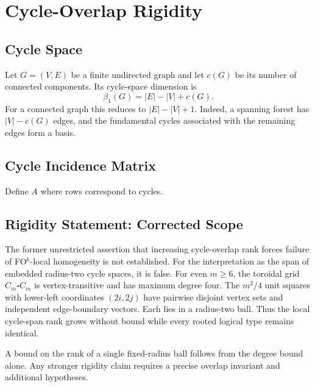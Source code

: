 \chapter{Cycle-Overlap Rigidity}

\section{Cycle Space}

Let \(G=(V,E)\) be a finite undirected graph and let \(c(G)\)
be its number of connected components. Its cycle-space dimension is
\[
\beta_1(G)=|E|-|V|+c(G).
\]
For a connected graph this reduces to \( |E|-|V|+1 \).
Indeed, a spanning forest has \( |V|-c(G) \) edges, and the
fundamental cycles associated with the remaining edges form a basis.

\section{Cycle Incidence Matrix}

Define \(A\) where rows correspond to cycles.

\section{Rigidity Statement: Corrected Scope}

The former unrestricted assertion that increasing cycle-overlap rank
forces failure of FO$^k$-local homogeneity is not established.
For the interpretation as the span of embedded radius-two cycle spaces,
it is false. For even \(m\ge6\), the toroidal grid
\(C_m\square C_m\) is vertex-transitive and has maximum degree four.
The \(m^2/4\) unit squares with lower-left coordinates \((2i,2j)\)
have pairwise disjoint vertex sets and independent edge-boundary vectors.
Each lies in a radius-two ball. Thus the local cycle-span rank grows
without bound while every rooted logical type remains identical.

A bound on the rank of a single fixed-radius ball follows from the
degree bound alone. Any stronger rigidity claim requires a precise
overlap invariant and additional hypotheses.

